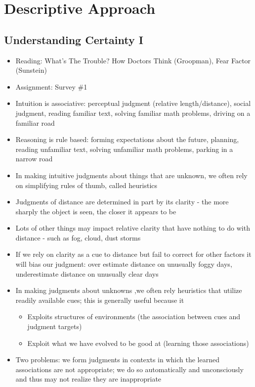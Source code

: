 \documentclass[12pt]{article}
\begin{document}
\newpage
\section{Descriptive Approach}

\subsection{Understanding Certainty I}
\begin{itemize}
\item Reading: What's The Trouble? How Doctors Think (Groopman), Fear Factor (Sunstein)
\item Assignment: Survey \#1
\item Intuition is associative: perceptual judgment (relative length/distance), social judgment, reading familiar text, solving familiar math problems, driving on a familiar road
\item Reasoning is rule based: forming expectations about the future, planning, reading unfamiliar text, solving unfamiliar math problems, parking in a narrow road
\item In making intuitive judgments about things that are unknown, we often rely on simplifying rules of thumb, called heuristics 
\item  Judgments of distance are determined in part by its clarity - the more sharply the object is seen, the closer it appears to be 
\item Lots of other things may impact relative clarity that have nothing to do with distance - such as fog, cloud, dust storms 
\item If we rely on clarity as a cue to distance but fail to correct for other factors it will bias our judgment: over estimate distance on unusually foggy days, underestimate distance on unusually clear days 
\item In making judgments about unknowns ,we often rely heuristics that utilize readily available cues; this is generally useful because it \begin{itemize} 
\item Exploits structures of environments (the association between cues and judgment targets) 
\item Exploit what we have evolved to be good at (learning those associations) \end{itemize} 
\item Two problems: we form judgments in contexts in which the learned associations are not appropriate; we do so automatically and unconsciously and thus may not realize they are inappropriate 

\end{itemize}
\end{document}
